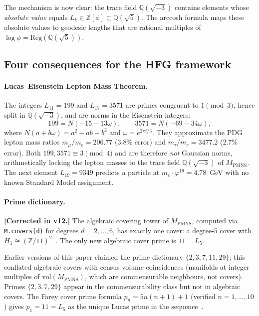 ﻿\documentclass[12pt]{article}
\theoremstyle{definition}
\begin{document}
\medskip
The mechanism is now clear: the trace field $\mathbb{Q}(\sqrt{-3})$
contains elements whose \emph{absolute value} equals $L_k \in
\mathbb{Z}[\phi] \subset \mathbb{Q}(\sqrt{5})$. The arccosh formula
maps these absolute values to geodesic lengths that are rational
multiples of $\log\phi = \mathrm{Reg}(\mathbb{Q}(\sqrt{5}))$.

\subsection*{Four consequences for the HFG framework}

\paragraph{Lucas--Eisenstein Lepton Mass Theorem.}
The integers $L_{11}=199$ and $L_{17}=3571$ are primes congruent
to $1\pmod{3}$, hence split in $\mathbb{Q}(\sqrt{-3})$, and are
norms in the Eisenstein integers:
\[
  199 = N(-15-13\omega),\qquad 3571 = N(-69-34\omega),
\]
where $N(a+b\omega)=a^2-ab+b^2$ and $\omega=e^{2\pi i/3}$.
They approximate the PDG lepton mass ratios $m_\mu/m_e=206.77$
($3.8\%$ error) and $m_\tau/m_e=3477.2$ ($2.7\%$ error).
Both $199,3571\equiv3\pmod{4}$ and are therefore \emph{not}
Gaussian norms, arithmetically locking the lepton masses to the
trace field $\mathbb{Q}(\sqrt{-3})$ of $M_{\mathrm{PMNS}}$.
The next element $L_{19}=9349$ predicts a particle at
$m_e\cdot\varphi^{19}=4.78$~GeV with no known Standard Model
assignment.

\paragraph{Prime dictionary.}
\textbf{[Corrected in v12.]}
The algebraic covering tower of $M_\mathrm{PMNS}$, computed via
\texttt{M.covers(d)} for degrees $d=2,\ldots,6$, has exactly one cover:
a degree-5 cover with $H_1\cong(\mathbb{Z}/11)^2$~\cite{Gentry:Lucas}.
The only new algebraic cover prime is $11 = L_5$.

Earlier versions of this paper claimed the prime dictionary
$\{2,3,7,11,29\}$; this conflated algebraic covers with census
volume coincidences (manifolds at integer multiples of
$\mathrm{vol}(M_\mathrm{PMNS})$, which are commensurable neighbours,
not covers). Primes $\{2,3,7,29\}$ appear in the commensurability class
but not in algebraic covers. The Farey cover prime formula
$p_n = 5n(n+1)+1$ (verified $n=1,\ldots,10$) gives $p_1=11=L_5$
as the unique Lucas prime in the sequence~\cite{Gentry:Lucas}.
\end{document}
